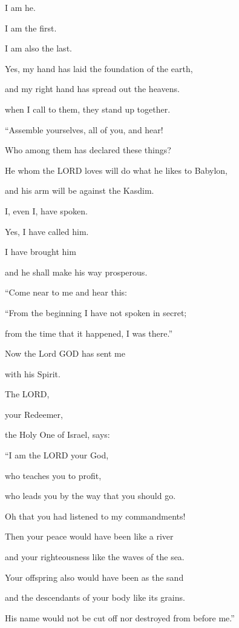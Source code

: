 I am he.

I am the first.

I am also the last.

\myverse{}Yes, my hand has laid the foundation of the earth,

and my right hand has spread out the heavens.

when I call to them, they stand up together.


\vspace{\baselineskip} \myverse{}“Assemble yourselves, all of you, and hear!

Who among them has declared these things?

He whom the LORD loves will do what he likes to Babylon,

and his arm will be against the Kasdim.

\myverse{}I, even I, have spoken.

Yes, I have called him.

I have brought him

and he shall make his way prosperous.

\myverse{}“Come near to me and hear this:

\vspace{\baselineskip} 
“From the beginning I have not spoken in secret;

from the time that it happened, I was there.”

\vspace{\baselineskip} 
Now the Lord GOD has sent me

with his Spirit.


\vspace{\baselineskip} \myverse{}The LORD,

your Redeemer,

the Holy One of Israel, says:

“I am the LORD your God,

who teaches you to profit,

who leads you by the way that you should go.

\myverse{}Oh that you had listened to my commandments!

Then your peace would have been like a river

and your righteousness like the waves of the sea.

\myverse{}Your offspring also would have been as the sand

and the descendants of your body like its grains.

His name would not be cut off nor destroyed from before me.”


